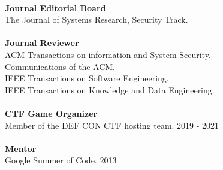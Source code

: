 \documentclass[11pt]{article}
\begin{document}
%
\\
\textbf{Journal Editorial Board} \\
The Journal of Systems Research, Security Track. \\
\\
%
\textbf{Journal Reviewer} \\
ACM Transactions on information and System Security. \\
Communications of the ACM. \\
IEEE Transactions on Software Engineering. \\
IEEE Transactions on Knowledge and Data Engineering. \\
\\
\textbf{CTF Game Organizer} \\
Member of the DEF CON CTF hosting team. \hfill{2019 - 2021}
%
\\\\
\textbf{Mentor} \\
Google Summer of Code.  \hfill{2013}
\end{document}
